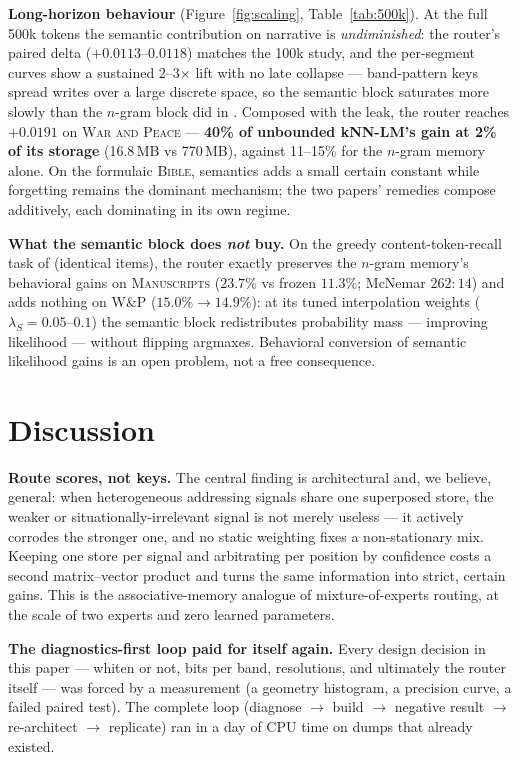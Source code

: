 \documentclass[11pt]{article}
\begin{document}
\textbf{Long-horizon behaviour} (Figure~\ref{fig:scaling}, Table~\ref{tab:500k}). At the full 500k tokens the semantic contribution on narrative is \emph{undiminished}: the router's paired delta ($+0.0113$--$0.0118$) matches the 100k study, and the per-segment curves show a sustained 2--3$\times$ lift with no late collapse --- band-pattern keys spread writes over a large discrete space, so the semantic block saturates more slowly than the $n$-gram block did in \cite{sillage}. Composed with the leak, the router reaches $+0.0191$ on \textsc{War and Peace} --- \textbf{40\% of unbounded kNN-LM's gain at 2\% of its storage} (16.8\,MB vs 770\,MB), against 11--15\% for the $n$-gram memory alone. On the formulaic \textsc{Bible}, semantics adds a small certain constant while forgetting remains the dominant mechanism; the two papers' remedies compose additively, each dominating in its own regime.

\textbf{What the semantic block does \emph{not} buy.} On the greedy content-token-recall task of \cite{sillage} (identical items), the router exactly preserves the $n$-gram memory's behavioral gains on \textsc{Manuscripts} ($23.7\%$ vs frozen $11.3\%$; McNemar $262{:}14$) and adds nothing on \textsc{W\&P} ($15.0\% \to 14.9\%$): at its tuned interpolation weights ($\lambda_S = 0.05$--$0.1$) the semantic block redistributes probability mass --- improving likelihood --- without flipping argmaxes. Behavioral conversion of semantic likelihood gains is an open problem, not a free consequence.

\section{Discussion}

\textbf{Route scores, not keys.} The central finding is architectural and, we believe, general: when heterogeneous addressing signals share one superposed store, the weaker or situationally-irrelevant signal is not merely useless --- it actively corrodes the stronger one, and no static weighting fixes a non-stationary mix. Keeping one store per signal and arbitrating per position by confidence costs a second matrix--vector product and turns the same information into strict, certain gains. This is the associative-memory analogue of mixture-of-experts routing, at the scale of two experts and zero learned parameters.

\textbf{The diagnostics-first loop paid for itself again.} Every design decision in this paper --- whiten or not, bits per band, resolutions, and ultimately the router itself --- was forced by a measurement (a geometry histogram, a precision curve, a failed paired test). The complete loop (diagnose $\to$ build $\to$ negative result $\to$ re-architect $\to$ replicate) ran in a day of CPU time on dumps that already existed.
\end{document}
